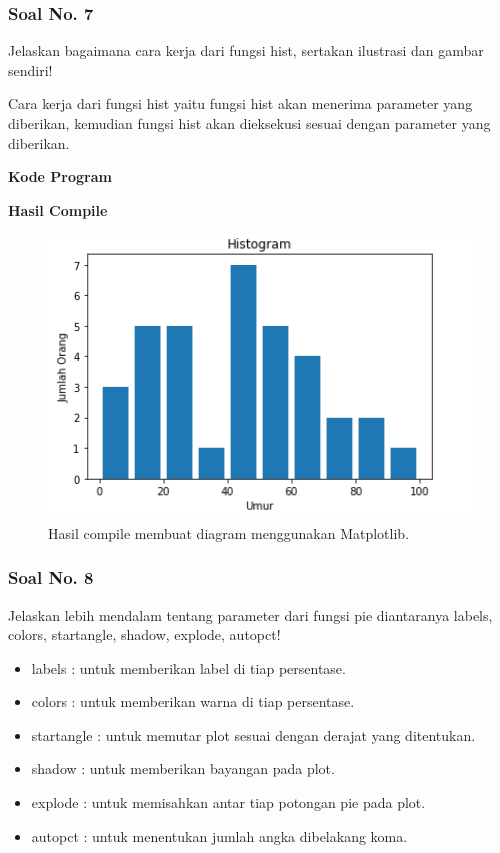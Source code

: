 \subsubsection{Soal No. 7}
\hfill \break
Jelaskan bagaimana cara kerja dari fungsi hist, sertakan ilustrasi dan gambar sendiri!

\hfill \break
Cara kerja dari fungsi hist yaitu fungsi hist akan menerima parameter yang diberikan, kemudian fungsi hist akan dieksekusi sesuai dengan parameter yang diberikan.

\hfill \break
\textbf{Kode Program}



\hfill \break
\textbf{Hasil Compile}

\begin{figure}[H]
	\includegraphics[width=12cm]{figures/6/1174042/10.png}
	\centering
	\caption{Hasil compile membuat diagram menggunakan Matplotlib.}
\end{figure}

\subsubsection{Soal No. 8}
\hfill \break
 Jelaskan lebih mendalam tentang parameter dari fungsi pie diantaranya labels, colors, startangle, shadow, explode, autopct!
 
 \begin{itemize}
 	\item labels : untuk memberikan label di tiap persentase.
 	\item colors : untuk memberikan warna di tiap persentase.
 	\item startangle : untuk memutar plot sesuai dengan derajat yang ditentukan.
 	\item shadow : untuk memberikan bayangan pada plot.
 	\item explode : untuk memisahkan antar tiap potongan pie pada plot.
 	\item autopct : untuk menentukan jumlah angka dibelakang koma.
 \end{itemize}


